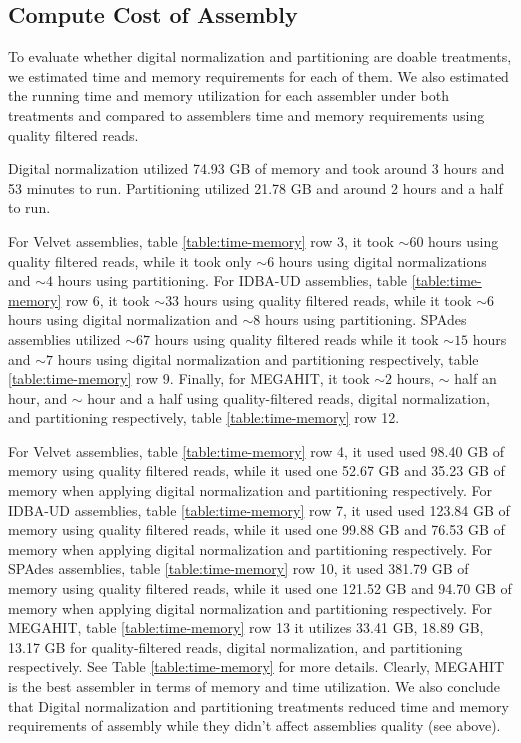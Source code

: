 \subsection*{Compute Cost of Assembly} 
To evaluate whether digital normalization and partitioning are doable treatments, we estimated time and memory requirements for each of them. We also estimated the running time and memory utilization for each assembler under both treatments and compared to assemblers time and memory requirements using quality filtered reads.  

Digital normalization utilized 74.93 GB of memory and took around 3
hours and 53 minutes to run. Partitioning utilized 21.78 GB and around
2 hours and a half to run.

For Velvet assemblies, table \ref{table:time-memory} row 3, it took $\sim 60$ hours using quality filtered reads, while it took only $\sim 6$ hours using digital normalizations
and $\sim 4$ hours using partitioning.  For IDBA-UD assemblies, table \ref{table:time-memory} row 6, it took $\sim 33$ hours using quality filtered reads, while it took $\sim 6$
hours using digital normalization and $\sim 8$ hours using
partitioning.  SPAdes assemblies utilized $\sim 67$ hours using quality
filtered reads while it took $\sim15$ hours and $\sim 7$ hours using
digital normalization and partitioning respectively, table \ref{table:time-memory} row 9. Finally, for
MEGAHIT, it took $\sim 2$ hours, $\sim$ half an hour, and $\sim$ hour
and a half using quality-filtered reads, digital normalization, and
partitioning respectively, table \ref{table:time-memory} row 12.
 
For Velvet assemblies, table \ref{table:time-memory} row 4, it used used 98.40 GB of memory using quality
filtered reads, while it used one 52.67 GB and 35.23 GB of memory when
applying digital normalization and partitioning respectively. For IDBA-UD
assemblies, table \ref{table:time-memory} row 7, it used used 123.84 GB of memory using quality filtered
reads, while it used one 99.88 GB and 76.53 GB of memory when applying
digital normalization and partitioning respectively. For SPAdes
assemblies, table \ref{table:time-memory} row 10, it used 381.79 GB of memory using quality filtered reads,
while it used one 121.52 GB and 94.70 GB of memory when applying
digital normalization and partitioning respectively.  For MEGAHIT, table \ref{table:time-memory} row 13 it
utilizes 33.41 GB, 18.89 GB, 13.17 GB for quality-filtered reads,
digital normalization, and partitioning respectively. See Table
\ref{table:time-memory} for more details. Clearly, MEGAHIT is the
best assembler in terms of memory and time utilization. We also
conclude that Digital normalization and partitioning treatments
reduced time and memory requirements of assembly while they didn't
affect assemblies quality (see above).

